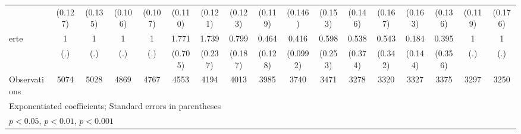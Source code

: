 {\begin{tabular}{l*{16}{c}}
                    &     (0.127)         &     (0.135)         &     (0.106)         &     (0.107)         &     (0.110)         &     (0.121)         &     (0.123)         &     (0.119)         &     (0.146)         &     (0.153)         &     (0.146)         &     (0.167)         &     (0.163)         &     (0.136)         &     (0.119)         &     (0.176)         \\
[1em]
erte                &           1         &           1         &           1         &           1         &       1.771         &       1.739\sym{***}&       0.799         &       0.464\sym{**} &       0.416\sym{***}&       0.598         &       0.538         &       0.543         &       0.184\sym{*}  &       0.395         &           1         &           1         \\
                    &         (.)         &         (.)         &         (.)         &         (.)         &     (0.705)         &     (0.237)         &     (0.187)         &     (0.128)         &    (0.0992)         &     (0.253)         &     (0.374)         &     (0.342)         &     (0.144)         &     (0.356)         &         (.)         &         (.)         \\
\hline
Observations        &        5074         &        5028         &        4869         &        4767         &        4553         &        4194         &        4013         &        3985         &        3740         &        3471         &        3278         &        3320         &        3327         &        3375         &        3297         &        3250         \\
\hline\hline
\multicolumn{17}{l}{\footnotesize Exponentiated coefficients; Standard errors in parentheses}\\
\multicolumn{17}{l}{\footnotesize \sym{*} \(p<0.05\), \sym{**} \(p<0.01\), \sym{***} \(p<0.001\)}\\
\end{tabular}
}
